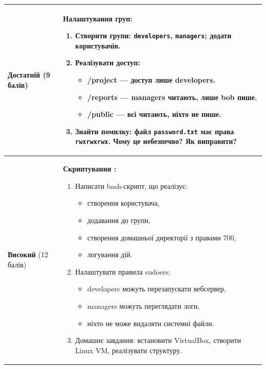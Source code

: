 \begin{table}[h!]
\begin{tabular}{
  | >{\raggedright\arraybackslash}p{} 
  | >{\raggedright\arraybackslash}p{} |
}
\cellcolor{TableBodyGreen}
\textbf{Достатній} (9 балів) &
\textbf{Налаштування груп:}
\begin{enumerate}
    \item Створити групи: \texttt{developers}, \texttt{managers}; додати користувачів.
    \item Реалізувати доступ:
    \begin{itemize}
        \item /project — доступ лише developers. \vspace{-0.5em}
        \item /reports — managers читають, лише bob пише. \vspace{-0.5em}
        \item /public — всі читають, ніхто не пише. \vspace{-0.5em}
    \end{itemize}
    \item Знайти помилку: файл \texttt{password.txt} має права \texttt{rwxrwxrwx}. Чому це небезпечно? Як виправити?
\end{enumerate} \\ \hline

\cellcolor{TableBodyGreen}
\textbf{Високий} (12 балів) &
\textbf{Скриптування :}
\begin{enumerate}
    \item Написати bash-скрипт, що реалізує:
    \begin{itemize}
        \item створення користувача, \vspace{-0.5em}
        \item додавання до групи, \vspace{-0.5em}
        \item створення домашньої директорії з правами 700, \vspace{-0.5em}
        \item логування дій. \vspace{-0.5em}
    \end{itemize}
    \item Налаштувати правила sudoers:
    \begin{itemize}
        \item developers можуть перезапускати вебсервер, \vspace{-0.5em}
        \item managers можуть переглядати логи, \vspace{-0.5em}
        \item ніхто не може видаляти системні файли. \vspace{-0.5em}
    \end{itemize}
    \item Домашнє завдання: встановити VirtualBox, створити Linux VM, реалізувати структуру.
\end{enumerate} \\ \hline

\end{tabular}
\end{table}
